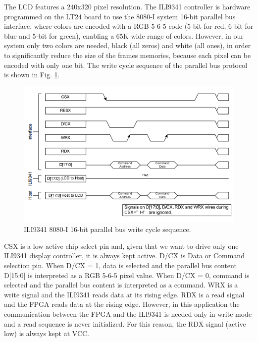 \documentclass[11pt]{report}
\begin{document}
The LCD features a 240x320 pixel resolution. The ILI9341 controller is hardware programmed on the LT24 board to use the 8080-I system 16-bit parallel bus interface, where colors are encoded with a RGB 5-6-5 code (5-bit for red, 6-bit for blue and 5-bit for green), enabling a 65K wide range of colors. However, in our system only two colors are needed, black (all zeros) and white (all ones), in order to significantly reduce the size of the frames memories, because each pixel can be encoded with only one bit. The write cycle sequence of the parallel bus protocol is shown in Fig. \ref{fig:8080_protocol}.

\begin{figure}
    \centering
    \includegraphics[width=1\linewidth]{images/graphic_interface_design/LT24_LCD_driver/8080_protocol.png}
    \caption{ILI9341 8080-I 16-bit parallel bus write cycle sequence.}
    \label{fig:8080_protocol}
\end{figure}

CSX is a low active chip select pin and, given that we want to drive only one ILI9341 display controller, it is always kept active. D/CX is Data or Command selection pin. When D/CX = 1, data is selected and the parallel bus content D[15:0] is interpreted as a RGB 5-6-5 pixel value. When D/CX = 0, command is selected and the parallel bus content is interpreted as a command. WRX is a write signal and the ILI9341 reads data at its rising edge. RDX is a read signal and the FPGA reads data at the rising edge. However, in this application the communication between the FPGA and the ILI9341 is needed only in write mode and a read sequence is never initialized. For this reason, the RDX signal (active low) is always kept at VCC.
\end{document}
